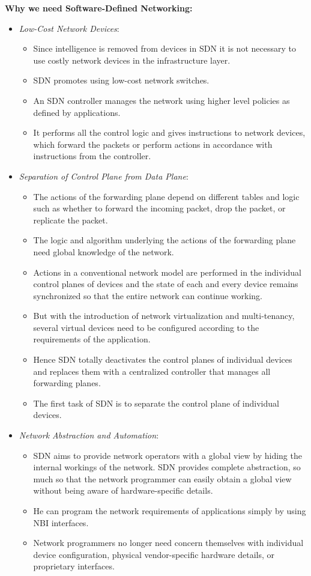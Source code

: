 \documentclass[a4paper, 12pt]{article}
\begin{document}
\textbf{Why we need Software-Defined Networking:}
\begin{itemize}
\item
\textit{Low-Cost Network Devices}:
\begin{itemize}
\item
Since intelligence is removed from devices in SDN it is not necessary to use costly network devices in the infrastructure layer.
\item
SDN promotes using low-cost network switches.
\item
An SDN controller manages the network using higher level policies as defined by applications.
\item
It performs all the control logic and gives instructions to network devices, which forward the packets or perform actions in accordance with instructions from the controller.
\end{itemize}

\item
\textit{Separation of Control Plane from Data Plane}:
\begin{itemize}
\item
The actions of the forwarding plane depend on different tables and logic such as whether to forward the incoming packet, drop the packet, or replicate the packet.
\item
The logic and algorithm underlying the actions of the forwarding plane need global knowledge of the network.
\item
Actions in a conventional network model are performed in the individual control planes of devices and the state of each and every device remains synchronized so that the entire network can continue working. 
\item
But with the introduction of network virtualization and multi-tenancy, several virtual devices need to be configured according to the requirements of the application.
\item
Hence SDN totally deactivates the control planes of individual devices and replaces them with a centralized controller that manages all forwarding planes.
\item
The first task of SDN is to separate the control plane of individual devices.
\end{itemize}

\item
\textit{Network Abstraction and Automation}:
\begin{itemize}
\item
SDN aims to provide network operators with a global view by hiding the internal workings of the network. SDN provides complete abstraction, so much so that the network programmer can easily obtain a global view without being aware of hardware-specific details.
\item
He can program the network requirements of applications simply by using NBI interfaces. 
\item
Network programmers no longer need concern themselves with individual device configuration, physical vendor-specific hardware details, or proprietary interfaces.
\end{itemize}


\end{itemize}
\end{document}
